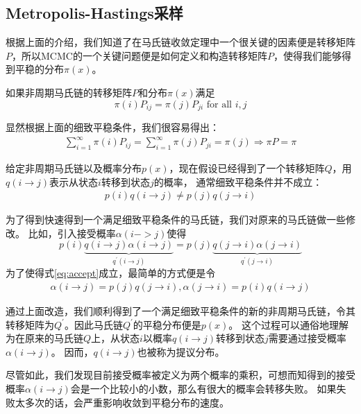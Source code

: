 \subsection{Metropolis-Hastings采样}
根据上面的介绍，我们知道了在马氏链收敛定理中一个很关键的因素便是转移矩阵$P$，所以MCMC的一个关键问题便是如何定义和构造转移矩阵$P$，使得我们能够得到平稳的分布$\pi(x)$。

\begin{theorem}[细致平稳条件]
如果非周期马氏链的转移矩阵$P$和分布$\pi(x)$满足
\begin{equation}
\pi(i) P_{ij} = \pi(j) P_{ji}\mbox{  for all }i,j
\end{equation}
\end{theorem}

显然根据上面的细致平稳条件，我们很容易得出：
\begin{align*}
\sum_{i=1}^{\infty}{\pi(i) P_{ij}} = \sum_{i=1}^{\infty}{\pi(j) P_{ji}}= \pi(j) \Rightarrow \pi P = \pi
\end{align*}

给定非周期马氏链以及概率分布$p(x)$，现在假设已经得到了一个转移矩阵$Q$，用$q(i \rightarrow j)$表示从状态$i$转移到状态$j$的概率，
通常细致平稳条件并不成立：
\begin{align*}
p(i)q(i\rightarrow j) \neq p(j) q(j \rightarrow i)
\end{align*}

为了得到快速得到一个满足细致平稳条件的马氏链，我们对原来的马氏链做一些修改。
比如，引入接受概率$\alpha(i -> j)$使得
\begin{equation}
\label{eq:accept}
p(i) \underbrace{q(i \rightarrow j) \alpha(i \rightarrow j)}_{q^{\prime}(i \rightarrow j)}= p(j) \underbrace{q( j \rightarrow i ) \alpha(j \rightarrow i)}_{q^{\prime}(j \rightarrow i)}
\end{equation}
为了使得式\ref{eq:accept}成立，最简单的方式便是令
\begin{align*}
\alpha(i \rightarrow j ) = p(j)q(j \rightarrow i), \alpha(j \rightarrow i) = p(i) q(i \rightarrow j)
\end{align*}

通过上面改造，我们顺利得到了一个满足细致平稳条件的新的非周期马氏链，令其转移矩阵为$Q^{\prime}$。因此马氏链$Q^{\prime}$的平稳分布便是$p(x)$。
这个过程可以通俗地理解为在原来的马氏链$Q$上，从状态$i$以概率$q(i \rightarrow j)$转移到状态$j$需要通过接受概率$\alpha(i \rightarrow j)$。
因而，$q(i \rightarrow j)$也被称为提议分布。

尽管如此，我们发现目前接受概率被定义为两个概率的乘积，可想而知得到的接受概率$\alpha(i \rightarrow j)$会是一个比较小的小数，那么有很大的概率会转移失败。
如果失败太多次的话，会严重影响收敛到平稳分布的速度。

